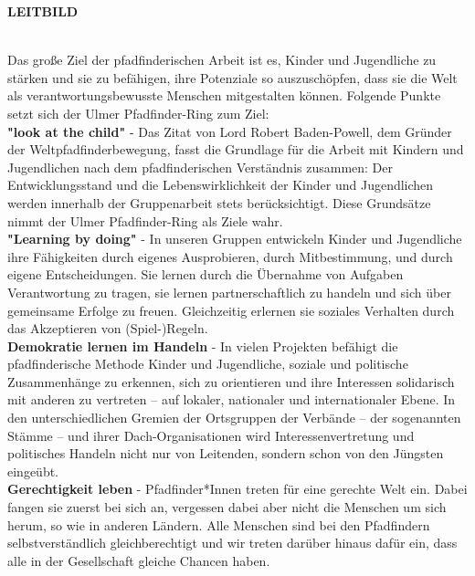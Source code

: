 \begin{Large}
    \textbf{LEITBILD}
\end{Large}
\\

Das große Ziel der pfadfinderischen Arbeit ist es, Kinder und Jugendliche zu stärken und sie zu 
befähigen, ihre Potenziale so auszuschöpfen, dass sie die Welt als verantwortungsbewusste Menschen 
mitgestalten können. Folgende Punkte setzt sich der Ulmer Pfadfinder-Ring zum Ziel:
\\

\textbf{"look at the child"} - Das Zitat von Lord Robert Baden-Powell, dem Gründer der 
Weltpfadfinderbewegung, fasst die Grundlage für die Arbeit mit Kindern und Jugendlichen nach dem 
pfadfinderischen Verständnis zusammen: Der Entwicklungsstand und die Lebenswirklichkeit der Kinder 
und Jugendlichen werden innerhalb der Gruppenarbeit stets berücksichtigt. Diese Grundsätze nimmt 
der Ulmer Pfadfinder-Ring als Ziele wahr.
\\

\textbf{"Learning by doing"} - In unseren Gruppen entwickeln Kinder und Jugendliche ihre Fähigkeiten 
durch eigenes Ausprobieren, durch Mitbestimmung, und durch eigene Entscheidungen. Sie lernen durch 
die Übernahme von Aufgaben Verantwortung zu tragen, sie lernen partnerschaftlich zu handeln und 
sich über gemeinsame Erfolge zu freuen. Gleichzeitig erlernen sie soziales Verhalten durch das 
Akzeptieren von (Spiel-)Regeln.
\\

\textbf{Demokratie lernen im Handeln} - In vielen Projekten befähigt die pfadfinderische Methode 
Kinder und Jugendliche, soziale und politische Zusammenhänge zu erkennen, sich zu orientieren und 
ihre Interessen solidarisch mit anderen zu vertreten – auf lokaler, nationaler und internationaler 
Ebene. In den unterschiedlichen Gremien der Ortsgruppen der Verbände – der sogenannten Stämme – und 
ihrer Dach-Organisationen wird Interessenvertretung und politisches Handeln nicht nur von 
Leitenden, sondern schon von den Jüngsten eingeübt.
\\

\textbf{Gerechtigkeit leben} - Pfadfinder*Innen treten für eine gerechte Welt ein. Dabei fangen sie 
zuerst bei sich an, vergessen dabei aber nicht die Menschen um sich herum, so wie in anderen 
Ländern. Alle Menschen sind bei den Pfadfindern selbstverständlich gleichberechtigt und wir treten 
darüber hinaus dafür ein, dass alle in der Gesellschaft gleiche Chancen haben.
\\

